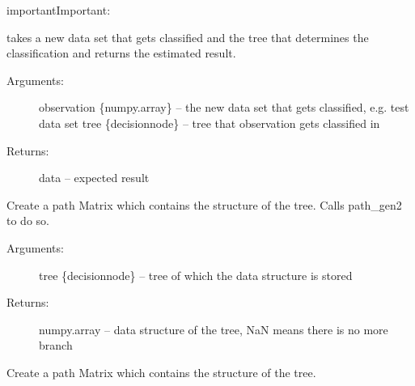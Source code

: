 \documentclass[letterpaper,10pt,english]{sphinxmanual}
\begin{document}
\begin{sphinxadmonition}{important}{Important:}
\begin{fulllineitems}
\end{fulllineitems}

\label{\detokenize{DT:classify}}

\begin{fulllineitems}
\label{\detokenize{DT:ForestFire.Main.classify}}
takes a new data set that gets classified and the tree that determines the classification and returns the estimated result.
\begin{description}
\item[{Arguments:}] \leavevmode
observation \{numpy.array\} -- the new data set that gets classified, e.g. test data set
tree \{decisionnode\} -- tree that observation gets classified in

\item[{Returns:}] \leavevmode
data -- expected result

\end{description}

\end{fulllineitems}

\label{\detokenize{DT:pathgen}}

\begin{fulllineitems}
\label{\detokenize{DT:ForestFire.Main.path_gen}}
Create a path Matrix which contains the structure of the tree. Calls path\_gen2 to do so.
\begin{description}
\item[{Arguments:}] \leavevmode
tree \{decisionnode\} -- tree of which the data structure is stored

\item[{Returns:}] \leavevmode
numpy.array -- data structure of the tree, NaN means there is no more branch

\end{description}

\end{fulllineitems}

\label{\detokenize{DT:pathgen2}}

\begin{fulllineitems}
\label{\detokenize{DT:ForestFire.Main.path_gen2}}
Create a path Matrix which contains the structure of the tree.


\end{fulllineitems}
\end{sphinxadmonition}
\end{document}
